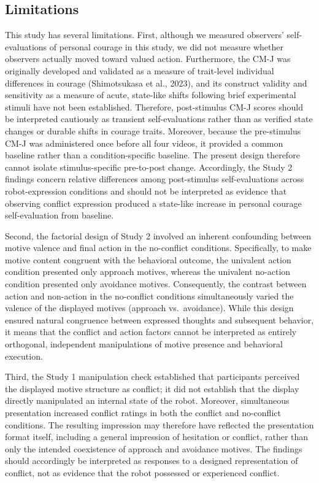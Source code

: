\documentclass[
]{article}
\begin{document}
\subsection{Limitations}\label{limitations}

This study has several limitations. First, although we measured
observers' self-evaluations of personal courage in this study, we did
not measure whether observers actually moved toward valued action.
Furthermore, the CM-J was originally developed and validated as a
measure of trait-level individual differences in courage (Shimotsukasa
et al., 2023), and its construct validity and sensitivity as a measure
of acute, state-like shifts following brief experimental stimuli have
not been established. Therefore, post-stimulus CM-J scores should be
interpreted cautiously as transient self-evaluations rather than as
verified state changes or durable shifts in courage traits. Moreover,
because the pre-stimulus CM-J was administered once before all four
videos, it provided a common baseline rather than a condition-specific
baseline. The present design therefore cannot isolate stimulus-specific
pre-to-post change. Accordingly, the Study 2 findings concern relative
differences among post-stimulus self-evaluations across robot-expression
conditions and should not be interpreted as evidence that observing
conflict expression produced a state-like increase in personal courage
self-evaluation from baseline.

Second, the factorial design of Study 2 involved an inherent confounding
between motive valence and final action in the no-conflict conditions.
Specifically, to make motive content congruent with the behavioral
outcome, the univalent action condition presented only approach motives,
whereas the univalent no-action condition presented only avoidance
motives. Consequently, the contrast between action and non-action in the
no-conflict conditions simultaneously varied the valence of the
displayed motives (approach vs.~avoidance). While this design ensured
natural congruence between expressed thoughts and subsequent behavior,
it means that the conflict and action factors cannot be interpreted as
entirely orthogonal, independent manipulations of motive presence and
behavioral execution.

Third, the Study 1 manipulation check established that participants
perceived the displayed motive structure as conflict; it did not
establish that the display directly manipulated an internal state of the
robot. Moreover, simultaneous presentation increased conflict ratings in
both the conflict and no-conflict conditions. The resulting impression
may therefore have reflected the presentation format itself, including a
general impression of hesitation or conflict, rather than only the
intended coexistence of approach and avoidance motives. The findings
should accordingly be interpreted as responses to a designed
representation of conflict, not as evidence that the robot possessed or
experienced conflict.
\end{document}
